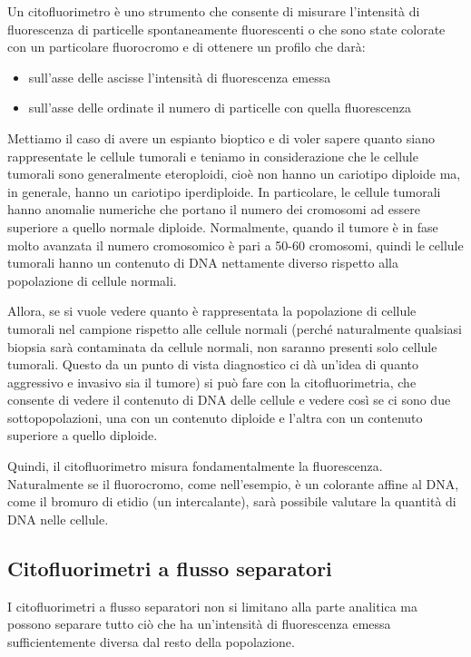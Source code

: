 \documentclass[11pt]{book}
\begin{document}
Un citofluorimetro è uno strumento che consente di misurare l’intensità di fluorescenza di particelle spontaneamente fluorescenti o che sono state colorate con un particolare fluorocromo e di ottenere un profilo che darà:
\begin{itemize}
\item sull’asse delle ascisse l’intensità di fluorescenza emessa 
\item sull’asse delle ordinate il numero di particelle con quella fluorescenza
\end{itemize}

Mettiamo il caso di avere un espianto bioptico e di voler sapere quanto siano rappresentate le cellule tumorali e teniamo in considerazione che le cellule tumorali sono generalmente eteroploidi, cioè non hanno un cariotipo diploide ma, in generale, hanno un cariotipo iperdiploide.
In particolare, le cellule tumorali hanno anomalie numeriche che portano il numero dei cromosomi ad essere superiore a quello normale diploide. 
Normalmente, quando il tumore è in fase molto avanzata il numero cromosomico è pari a 50-60 cromosomi, quindi le cellule tumorali hanno un contenuto di DNA nettamente diverso rispetto alla popolazione di cellule normali.

Allora, se si vuole vedere quanto è rappresentata la popolazione di cellule tumorali nel campione rispetto alle cellule normali (perché naturalmente qualsiasi biopsia sarà contaminata da cellule normali, non saranno presenti solo cellule tumorali. Questo da un punto di vista diagnostico ci dà un’idea di quanto aggressivo e invasivo sia il tumore) si può fare con la citofluorimetria, che consente di vedere il contenuto di DNA delle cellule e vedere così se ci sono due sottopopolazioni, una con un contenuto diploide e l’altra con un contenuto superiore a quello diploide.

Quindi, il citofluorimetro misura fondamentalmente la fluorescenza.\\ Naturalmente se il fluorocromo, come nell’esempio, è un colorante affine al DNA, come il bromuro di etidio (un intercalante), sarà possibile valutare la quantità di DNA nelle cellule.


\subsection{Citofluorimetri a flusso separatori}

I citofluorimetri a flusso separatori non si limitano alla parte analitica ma possono separare tutto ciò che ha un’intensità di fluorescenza emessa sufficientemente diversa dal resto della popolazione.
\end{document}
